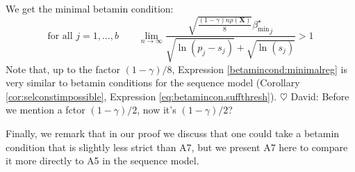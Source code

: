 \documentclass[aos]{imsart}
\theoremstyle{plain}
\newtheorem{lem}{\textsc{Lemma}}[section]
\newcommand{\david}[1]{{\small{\color{blue} \sf $\heartsuit$ David: #1}}}
\newcommand{\E}{\mathbb{E}}
\newcommand{\bs}{\boldsymbol}
\begin{document}
We get the minimal betamin condition:
\begin{equation}\label{betamincond:minimalreg} \mbox{for all }j=1,\ldots,b \qquad
    \lim_{n\to \infty}\frac{\sqrt{\frac{(1-\gamma) n\rho(\bs X)}{8}}{\beta_{\min}^{\star}}_j}{\sqrt{\ln(p_j-s_j)} + \sqrt{\ln(s_j)}} >1
\end{equation}
Note that, up to the factor $(1-\gamma)/8$, Expression \eqref{betamincond:minimalreg} is very similar to betamin conditions for the sequence model (Corollary \ref{cor:selconstimpossible}, Expression \eqref{eq:betamincon.suffthresh}).
\david{Before we mention a fctor $(1-\gamma)/2$, now it's $(1-\gamma)/2$?}


Finally, we remark that in our proof we discuss that one could take a betamin condition that is slightly less strict than A7, but we present A7 here to compare it more directly to A5 in the sequence model.  



\end{document}
